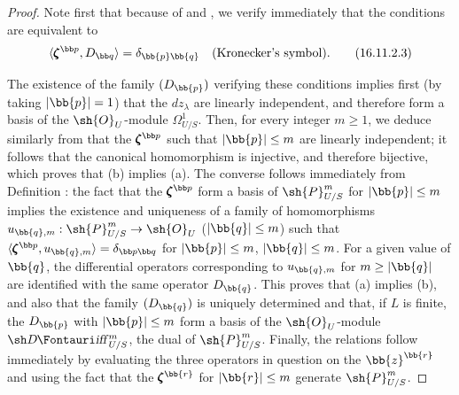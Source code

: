 \begin{proof}
Note first that because of  and , we verify immediately that the conditions  are equivalent to 
\[
  \label{IV.16.11.2.3}
  \langle \pmb{\zeta}^{\bb p}, D_{\bb q} \rangle = \delta_{\bb{p} \bb{q}} \quad (\text{Kronecker's symbol}).
  \tag{16.11.2.3}
\]

The existence of the family $(D_\bb{p})$ verifying these conditions implies first (by taking $|\bb{p}| = 1$) that the $dz_\lambda$ are linearly independent, and therefore form a basis of the $\sh{O}_U$-module $\Omega_{U/S}^1$.
Then, for every integer $m \geq 1$, we deduce similarly from  that the $\pmb{\zeta}^{\bb p}$ such that $|\bb{p}| \leq m$ are linearly independent;
it follows that the canonical homomorphism  is injective, and therefore bijective, which proves that (b) implies (a).
The converse follows immediately from Definition : the fact that the $\pmb{\zeta}^{\bb p}$ form a basis of $\sh{P}_{U/S}^m$ for $|\bb{p}| \leq m$ implies the existence and uniqueness of a family of homomorphisms $u_{\bb{q},m}: \sh{P}_{U/S}^m \to \sh{O}_U$ ($|\bb{q}| \leq m$) such that $\langle \pmb{\zeta}^{\bb p},u_{\bb{q},m}\rangle = \delta_{\bb p\bb q}$ for $|\bb{p}| \leq m$, $|\bb{q}| \leq m$.
For a given value of $\bb{q}$, the differential operators corresponding to $u_{\bb{q}, m}$ for $m \geq |\bb{q}|$ are identified with the same operator $D_\bb{q}$.
This proves that (a) implies (b), and also that the family $(D_\bb{q})$ is uniquely determined and that, if $L$ is finite, the $D_\bb{p}$ with $|\bb{p}| \leq m$ form a basis of the $\sh{O}_U$-module $\shDiff_{U/S}^m$, the dual of $\sh{P}_{U/S}^m$.
Finally, the relations  follow immediately by evaluating the three operators in question on the $\bb{z}^\bb{r}$ and using the fact that the $\pmb{\zeta}^\bb{r}$ for $|\bb{r}| \leq m$ generate $\sh{P}_{U/S}^m$.
\end{proof}


